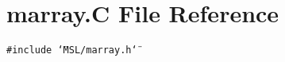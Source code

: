 \section{marray.C File Reference}
\label{marray_8C}
{\tt \#include \char`\"{}MSL/marray.h\char`\"{}}\par
